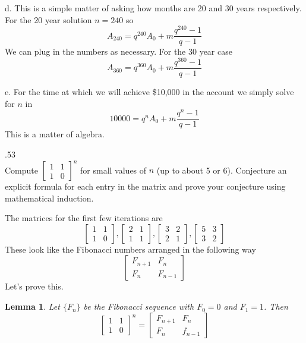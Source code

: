 \documentclass[10 pt]{amsart}
\newtheorem{lem}[thm]{Lemma}
\theoremstyle{definition}
\theoremstyle{remark}
\numberwithin{equation}{subsection}
\begin{document}
d. This is a simple matter of asking how months are 20 and 30 years respectively.
For the 20 year solution $n=240$ so
\[
A_{240} = q^{240}A_0 + m\frac{q^{240}-1}{q-1}
\]
We can plug in the numbers as necessary.
For the 30 year case
\[
A_{360} = q^{360}A_0 + m\frac{q^{360}-1}{q-1}
\]

e. For the time at which we will achieve \$10,000 in the account we simply solve for $n$ in
\[
10000 = q^nA_0 + m\frac{q^n-1}{q-1}
\]
This is a matter of algebra.

.53\\
Compute $\begin{bmatrix}
1&1\\
1&0
\end{bmatrix}^n$ for small values of $n$ (up to about 5 or 6).  Conjecture an explicit formula for each entry in the matrix and prove your conjecture using mathematical induction. 

The matrices for the first few iterations are
\[
\begin{bmatrix}
1&1\\
1&0
\end{bmatrix},
\begin{bmatrix}
2&1\\
1&1
\end{bmatrix},
\begin{bmatrix}
3&2\\
2&1
\end{bmatrix},
\begin{bmatrix}
5&3\\
3&2
\end{bmatrix}
\]
These look like the Fibonacci numbers arranged in the following way
\[
\begin{bmatrix}
F_{n+1}&F_n\\
F_n&F_{n-1}
\end{bmatrix}
\]
Let's prove this.
\begin{lem}
Let $\{F_n\}$ be the Fibonacci sequence with $F_0=0$ and $F_1=1$.
Then 
\[
\begin{bmatrix}
1&1\\
1&0
\end{bmatrix}^n = 
\begin{bmatrix}
F_{n+1}&F_n\\
F_n&f_{n-1}
\end{bmatrix}
\]
\end{lem}
\end{document}

